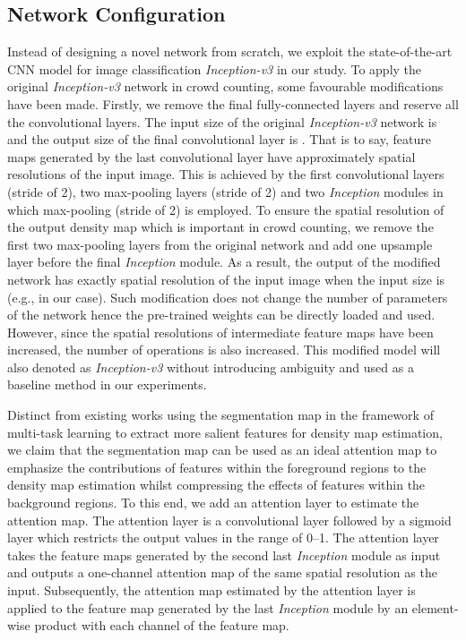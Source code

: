\documentclass[journal,comsoc]{IEEEtran}
\begin{document}
\subsection{Network Configuration} \label{sec:architecture}
Instead of designing a novel network from scratch, we exploit the state-of-the-art CNN model for image classification \textit{Inception-v3} in our study. 
To apply the original \textit{Inception-v3} network in crowd counting, some favourable modifications have been made. Firstly, we remove the final fully-connected layers and reserve all the convolutional layers. The input size of the original \textit{Inception-v3} network is  and the output size of the final convolutional layer is . That is to say, feature maps generated by the last convolutional layer have approximately  spatial resolutions of the input image. This is achieved by the first convolutional layers (stride of 2), two max-pooling layers (stride of 2) and two \textit{Inception} modules in which max-pooling (stride of 2) is employed. To ensure the spatial resolution of the output density map which is important in crowd counting, we remove the first two max-pooling layers from the original network and add one upsample layer before the final \textit{Inception} module. As a result, the output of the modified network has exactly  spatial resolution of the input image when the input size is  (e.g.,  in our case). Such modification does not change the number of parameters of the network hence the pre-trained weights can be directly loaded and used. However, since the spatial resolutions of intermediate feature maps have been increased, the number of operations is also increased. This modified model will also denoted as \textit{Inception-v3} without introducing ambiguity and used as a baseline method in our experiments.

Distinct from existing works using the segmentation map in the framework of multi-task learning \cite{zhao2019leveraging} to extract more salient features for density map estimation, we claim that the segmentation map can be used as an ideal attention map to emphasize the contributions of features within the foreground regions to the density map estimation whilst compressing the effects of features within the background regions. To this end, we add an attention layer to estimate the attention map. The attention layer is a convolutional layer followed by a sigmoid layer which restricts the output values in the range of 0--1. The attention layer takes the feature maps generated by the second last \textit{Inception} module as input and outputs a one-channel attention map of the same spatial resolution as the input. Subsequently, the attention map estimated by the attention layer is applied to the feature map generated by the last \textit{Inception} module by an element-wise product with each channel of the feature map.
\end{document}
